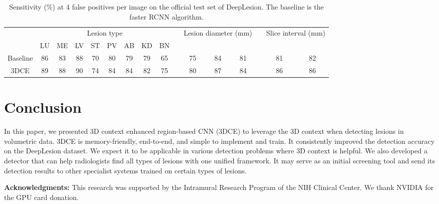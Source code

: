 \documentclass[a4paper]{llncs}
\begin{document}
\begin{table}[]
	\centering
	\scriptsize	
	\setlength{\tabcolsep}{2.7pt}
	\renewcommand{\arraystretch}{1.2}
	\caption{Sensitivity (\%) at 4 false positives per image on the official test set of DeepLesion. The baseline is the faster RCNN algorithm. }
	\begin{tabular}{cccccccccccccccc} 

		\hline 
		&	\multicolumn{8}{c}{Lesion type} && \multicolumn{3}{c}{Lesion diameter (mm)} && \multicolumn{2}{c}{Slice interval (mm)} \\
		
		& LU & ME & LV & ST & PV & AB & KD & BN &&  &  &  &&  &  \\
		\hline
		Baseline & 86 & 83 & 88 & 70 & 80 & 79 & 79 & 65 && 75 & 84 & 81 && 81 & 82 \\
		3DCE     & 89 & 88 & 90 & 74 & 84 & 84 & 82 & 75 && 80 & 87 & 84 && 86 & 86 \\
		
		\hline
	\end{tabular}
	
	\label{tbl:cls_official}
\end{table}

\section{Conclusion}
\label{sec:conclusion}
In this paper, we presented 3D context enhanced region-based CNN (3DCE) to leverage the 3D context when detecting lesions in volumetric data. 3DCE is memory-friendly, end-to-end, and simple to implement and train. It consistently improved the detection accuracy on the DeepLesion dataset. We expect it to be applicable in various detection problems where 3D context is helpful. We also developed a detector that can help radiologists find all types of lesions with one unified framework. It may serve as an initial screening tool and send its detection results to other specialist systems trained on certain types of lesions.


{\small \textbf{Acknowledgments:} This research was supported by the Intramural Research Program of the NIH Clinical Center. We thank NVIDIA for the GPU card donation.}


\end{document}
